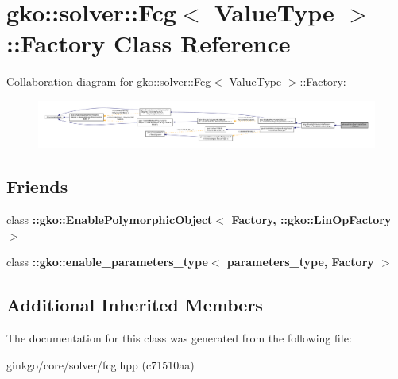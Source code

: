 \hypertarget{classgko_1_1solver_1_1Fcg_1_1Factory}{}\section{gko\+:\+:solver\+:\+:Fcg$<$ Value\+Type $>$\+:\+:Factory Class Reference}
\label{classgko_1_1solver_1_1Fcg_1_1Factory}


Collaboration diagram for gko\+:\+:solver\+:\+:Fcg$<$ Value\+Type $>$\+:\+:Factory\+:
\nopagebreak
\begin{figure}[H]
\begin{center}
\leavevmode
\includegraphics[width=350pt]{classgko_1_1solver_1_1Fcg_1_1Factory__coll__graph}
\end{center}
\end{figure}
\subsection*{Friends}
\begin{DoxyCompactItemize}
\item 
\mbox{\label{classgko_1_1solver_1_1Fcg_1_1Factory_a27e9bbc94a1c1c59f40833153eda8f78}} 
class {\bfseries \+::gko\+::\+Enable\+Polymorphic\+Object$<$ Factory, \+::gko\+::\+Lin\+Op\+Factory $>$}
\item 
\mbox{\label{classgko_1_1solver_1_1Fcg_1_1Factory_a0d176cbd42d6214e11aee8c30ca256fc}} 
class {\bfseries \+::gko\+::enable\+\_\+parameters\+\_\+type$<$ parameters\+\_\+type, Factory $>$}
\end{DoxyCompactItemize}
\subsection*{Additional Inherited Members}


The documentation for this class was generated from the following file\+:\begin{DoxyCompactItemize}
\item 
ginkgo/core/solver/fcg.\+hpp (c71510aa)\end{DoxyCompactItemize}
